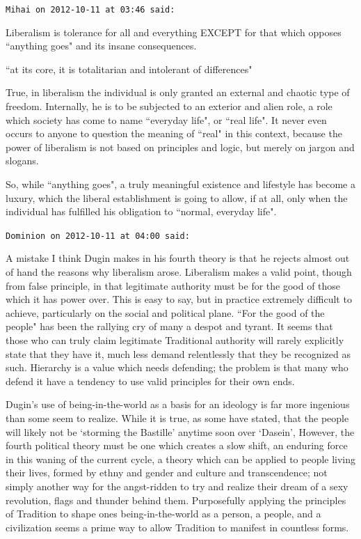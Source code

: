 \begin{footnotesize}\begin{sffamily}



\texttt{Mihai on 2012-10-11 at 03:46 said: }

Liberalism is tolerance for all and everything EXCEPT for that which opposes ``anything goes" and its insane
consequences. 

``at its core, it is totalitarian and intolerant of differences"

True, in liberalism the individual is only granted an external and chaotic type of freedom. Internally, he is to be
subjected to an exterior and alien role, a role which society has come to name ``everyday life", or ``real life". It
never even occurs to anyone to question the meaning of ``real" in this context, because the power of liberalism is not
based on principles and logic, but merely on jargon and slogans. 

So, while ``anything goes", a truly meaningful existence and lifestyle has become a luxury, which the liberal
establishment is going to allow, if at all, only when the individual has fulfilled his obligation to ``normal, everyday
life".


\hfill

\texttt{Dominion on 2012-10-11 at 04:00 said: }

A mistake I think Dugin makes in his fourth theory is that he rejects almost out of hand the reasons why liberalism
arose. Liberalism makes a valid point, though from false principle, in that legitimate authority must be for the good
of those which it has power over. This is easy to say, but in practice extremely difficult to achieve, particularly on
the social and political plane. ``For the good of the people" has been the rallying cry of many a despot and tyrant. It
seems that those who can truly claim legitimate Traditional authority will rarely explicitly state that they have it,
much less demand relentlessly that they be recognized as such. Hierarchy is a value which needs defending; the problem
is that many who defend it have a tendency to use valid principles for their own ends.

Dugin's use of being-in-the-world as a basis for an ideology is far more ingenious than some seem
to realize. While it is true, as some have stated, that the people will likely not be `storming
the Bastille' anytime soon over `Dasein', However, the
fourth political theory must be one which creates a slow shift, an enduring force in this waning of the current cycle,
a theory which can be applied to people living their lives, formed by ethny and gender and culture and transcendence;
not simply another way for the angst-ridden to try and realize their dream of a sexy revolution, flags and thunder
behind them. Purposefully applying the principles of Tradition to shape ones being-in-the-world as a person, a people,
and a civilization seems a prime way to allow Tradition to manifest in countless forms. 


\end{sffamily}
\end{footnotesize}
